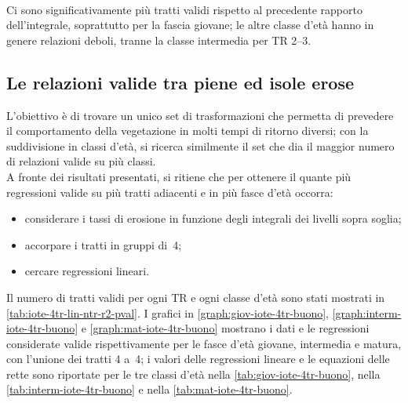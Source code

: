 %
\\
Ci sono significativamente più tratti validi rispetto al precedente rapporto dell'integrale, soprattutto per la fascia giovane; le altre classe d'età hanno in genere relazioni deboli, tranne la classe intermedia per TR \SIrange[range-phrase = {-}, range-units = single]{2}{3}{\mesi}.



\subsection{Le relazioni valide tra piene ed isole erose}
L'obiettivo è di trovare un unico set di trasformazioni che permetta di prevedere il comportamento della vegetazione in molti tempi di ritorno diversi; con la suddivisione in classi d'età, si ricerca similmente il set che dia il maggior numero di relazioni valide su più classi.
\\
A fronte dei risultati presentati, si ritiene che per ottenere il quante più regressioni valide su più tratti adiacenti e in più fasce d'età occorra:
%
\begin{itemize}
	\item considerare i tassi di erosione in funzione degli integrali dei livelli sopra soglia;
	\item accorpare i tratti in gruppi di~4;
	\item cercare regressioni lineari.
\end{itemize}
%
Il numero di tratti validi per ogni TR e ogni classe d'età sono stati mostrati in \cref{tab:iote-4tr-lin-ntr-r2-pval}.
I grafici in \cref{graph:giov-iote-4tr-buono}, \cref{graph:interm-iote-4tr-buono} e \cref{graph:mat-iote-4tr-buono} mostrano i dati e le regressioni considerate valide rispettivamente per le fasce d'età giovane, intermedia e matura, con l'unione dei tratti 4 a~4;
i valori delle regressioni lineare e le equazioni delle rette sono riportate per le tre classi d'età nella \cref{tab:giov-iote-4tr-buono}, nella \cref{tab:interm-iote-4tr-buono} e nella \cref{tab:mat-iote-4tr-buono}.

